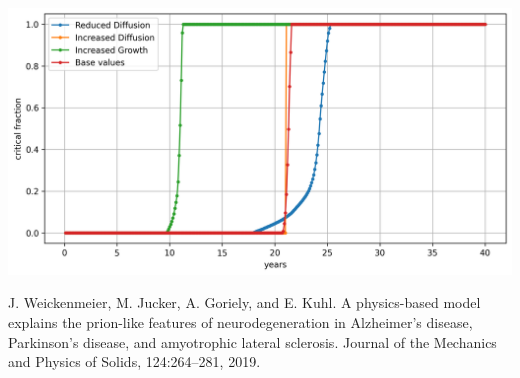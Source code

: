 \documentclass[12pt, letterpaper]{article}
\begin{document}
\noindent\includegraphics[width=\textwidth]{pics/critical_fraction_comparing.png}


\begin{thebibliography}{9}
    J. Weickenmeier, M. Jucker, A. Goriely, and E. Kuhl. A physics-based model explains the prion-like features of neurodegeneration in Alzheimer’s disease, Parkinson’s disease, and amyotrophic lateral sclerosis. Journal of the Mechanics and
    Physics of Solids, 124:264–281, 2019.
\end{thebibliography}
\end{document}
